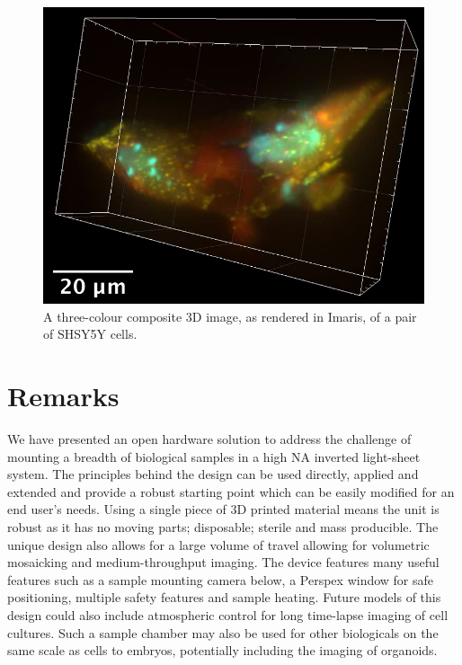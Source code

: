 \begin{figure}
    \centering
    \includegraphics[width=0.8\linewidth]{./cell_image}
    \caption{A three-colour composite 3D image, as rendered in Imaris, of a pair of SHSY5Y cells.}
    \label{fig:cell_image}
\end{figure}

\section{Remarks}

We have presented an open hardware solution to address the challenge of mounting a breadth of biological samples in a high NA inverted light-sheet system.
The principles behind the design can be  used directly, applied and extended and provide a robust starting point which can be easily modified for an end user’s needs.
Using a single piece of 3D printed material means the unit is robust as it has no moving parts; disposable; sterile and mass producible.
The unique design also allows for a large volume of travel allowing for volumetric mosaicking and medium-throughput imaging.
The device features many useful features such as a sample mounting camera below, a Perspex window for safe positioning, multiple safety features and sample heating.
Future models of this design could also include atmospheric control for long time-lapse imaging of cell cultures.
Such a sample chamber may also be used for other biologicals on the same scale as cells to embryos, potentially including the imaging of organoids.

